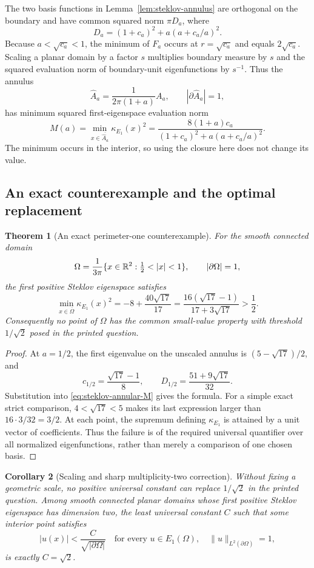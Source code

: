 \documentclass[11pt,a4paper]{article}
\newtheorem{theorem}{Theorem}[section]
\newtheorem{corollary}[theorem]{Corollary}
\theoremstyle{definition}\newtheorem{definition}[theorem]{Definition}
\theoremstyle{remark}\newtheorem{remark}[theorem]{Remark}
\begin{document}
The two basis functions in Lemma~\ref{lem:steklov-annulus} are orthogonal
on the boundary and have common squared norm $\pi D_a$, where
\[
 D_a=(1+c_a)^2+a(a+c_a/a)^2.
\]
Because $a<\sqrt{c_a}<1$, the minimum of $F_a$ occurs at
$r=\sqrt{c_a}$ and equals $2\sqrt{c_a}$. Scaling a planar domain by a
factor $s$ multiplies boundary measure by $s$ and the squared evaluation
norm of boundary-unit eigenfunctions by $s^{-1}$. Thus the annulus
\[
 \widehat A_a=\frac1{2\pi(1+a)}A_a,
 \qquad |\partial\widehat A_a|=1,
\]
has minimum squared first-eigenspace evaluation norm
\begin{equation}\label{eq:steklov-annular-M}
 M(a)=\min_{x\in\overline{\widehat A_a}}\kappa_{E_1}(x)^2
     =\frac{8(1+a)c_a}{(1+c_a)^2+a(a+c_a/a)^2}.
\end{equation}
The minimum occurs in the interior, so using the closure here does not
change its value.

\subsection{An exact counterexample and the optimal replacement}

\begin{theorem}[An exact perimeter-one counterexample]
\label{thm:steklov-counterexample}
For the smooth connected domain
\[
 \Omega=\frac1{3\pi}\{x\in\R^2:\tfrac12<|x|<1\},
 \qquad |\partial\Omega|=1,
\]
the first positive Steklov eigenspace satisfies
\[
 \min_{x\in\overline\Omega}\kappa_{E_1}(x)^2
 =-8+\frac{40\sqrt{17}}{17}
 =\frac{16(\sqrt{17}-1)}{17+3\sqrt{17}}>\frac12.
\]
Consequently no point of $\Omega$ has the common small-value property
with threshold $1/\sqrt2$ posed in the printed question.
\end{theorem}

\begin{proof}
At $a=1/2$, the first eigenvalue on the unscaled annulus is
$(5-\sqrt{17})/2$, and
\[
 c_{1/2}=\frac{\sqrt{17}-1}{8},\qquad
 D_{1/2}=\frac{51+9\sqrt{17}}{32}.
\]
Substitution into \eqref{eq:steklov-annular-M} gives the formula. For a
simple exact strict comparison, $4<\sqrt{17}<5$ makes its last expression
larger than $16\cdot3/32=3/2$. At each point, the supremum defining
$\kappa_{E_1}$ is attained by a unit vector of coefficients. Thus the
failure is of the required universal quantifier over all normalized
eigenfunctions, rather than merely a comparison of one chosen basis.
\end{proof}

\begin{corollary}[Scaling and sharp multiplicity-two correction]
\label{cor:steklov-sharp}
Without fixing a geometric scale, no positive universal constant can
replace $1/\sqrt2$ in the printed question. Among smooth connected planar
domains whose first positive Steklov eigenspace has dimension two, the
least universal constant $C$ such that some interior point satisfies
\[
 |u(x)|<\frac{C}{\sqrt{|\partial\Omega|}}
 \quad\text{for every }u\in E_1(\Omega),\quad
 \|u\|_{L^2(\partial\Omega)}=1,
\]
is exactly $C=\sqrt2$.
\end{corollary}
\end{document}
